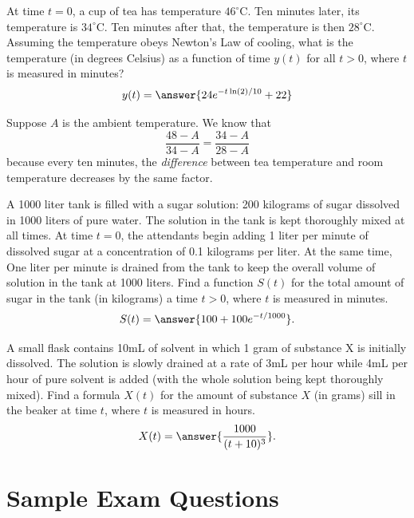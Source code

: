 \documentclass{ximera}
\begin{document}
\begin{exercise}
At time $t = 0$, a cup of tea has temperature $46^\circ$C. Ten minutes later, its temperature is $34^\circ$C. Ten minutes after that, the temperature is then $28^\circ$C. Assuming the temperature obeys Newton's Law of cooling, what is the temperature (in degrees Celsius) as a function of time $y(t)$ for all $t > 0$, where $t$ is measured in minutes?
\[ y(t) = \answer{24 e^{-t \ln(2)/10} + 22}  \]
\begin{hint}
Suppose $A$ is the ambient temperature. We know that
\[ \frac{48-A}{34 - A} = \frac{34 - A}{28 - A} \]
because every ten minutes, the \textit{difference} between tea temperature and room temperature decreases by the same factor.
\end{hint}
\end{exercise}


\begin{exercise}
A 1000 liter tank is filled with a sugar solution: 200 kilograms of sugar dissolved in 1000 liters of pure water. The solution in the tank is kept thoroughly mixed at all times. At time $t = 0$, the attendants begin adding 1 liter per minute of dissolved sugar at a concentration of 0.1 kilograms per liter. At the same time, One liter per minute is drained from the tank to keep the overall volume of solution in the tank at 1000 liters. Find a function $S(t)$ for the total amount of sugar in the tank (in kilograms) a time $t > 0$, where $t$ is measured in minutes.
\[ S(t) = \answer{ 100 + 100 e^{-t/1000}}. \]
\end{exercise}

\begin{exercise}
A small flask contains 10mL of solvent in which 1 gram of substance X is initially dissolved. The solution is slowly drained at a rate of 3mL per hour while 4mL per hour of pure solvent is added (with the whole solution being kept thoroughly mixed). Find a formula $X(t)$ for the amount of substance $X$ (in grams) sill in the beaker at time $t$, where $t$ is measured in hours.
\[ X(t) = \answer{ \frac{1000}{(t+10)^3}}. \]
\end{exercise}



\section*{Sample Exam Questions}
\end{document}
